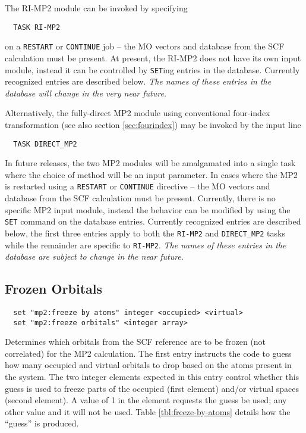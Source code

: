 \label{sec:mp2}
The RI-MP2 module can be invoked by specifying

\begin{verbatim}
  TASK RI-MP2
\end{verbatim}
on a \verb+RESTART+ or \verb+CONTINUE+ job -- the MO vectors and
database from the SCF calculation must be present.  At present, the
RI-MP2 does not have its own input module, instead it can be
controlled by \verb+SET+ing entries in the database.  Currently
recognized entries are described below. {\em The names of these
  entries in the database will change in the very near future.}

Alternatively, the fully-direct MP2 module using conventional
four-index transformation (see also section \ref{sec:fourindex}) may be
invoked by the input line
\begin{verbatim}
  TASK DIRECT_MP2
\end{verbatim}
In future releases, the two MP2 modules will be amalgamated into a
single task where the choice of method will be an input parameter.  In
cases where the MP2 is restarted using a \verb+RESTART+ or
\verb+CONTINUE+ directive -- the MO vectors and database from the SCF
calculation must be present.  Currently, there is no specific MP2
input module, instead the behavior can be modified by using the
\verb+SET+ command on the database entries. Currently recognized
entries are described below, the first three entries apply to both the
\verb+RI-MP2+ and \verb+DIRECT_MP2+ tasks while the remainder are
specific to \verb+RI-MP2+.  {\em The names of these entries in the
  database are subject to change in the near future.}

\subsection{Frozen Orbitals}

\begin{verbatim}
  set "mp2:freeze by atoms" integer <occupied> <virtual>
  set "mp2:freeze orbitals" <integer array>
\end{verbatim}

Determines which orbitals from the SCF reference are to be frozen (not
correlated) for the MP2 calculation.  The first entry instructs the
code to guess how many occupied and virtual orbitals to drop based on
the atoms present in the system.  The two integer elements expected in
this entry control whether this guess is used to freeze parts of the
occupied (first element) and/or virtual spaces (second element).  A
value of 1 in the element requests the guess be used; any other value
and it will not be used.  Table \ref{tbl:freeze-by-atoms} details how
the ``guess'' is produced.

